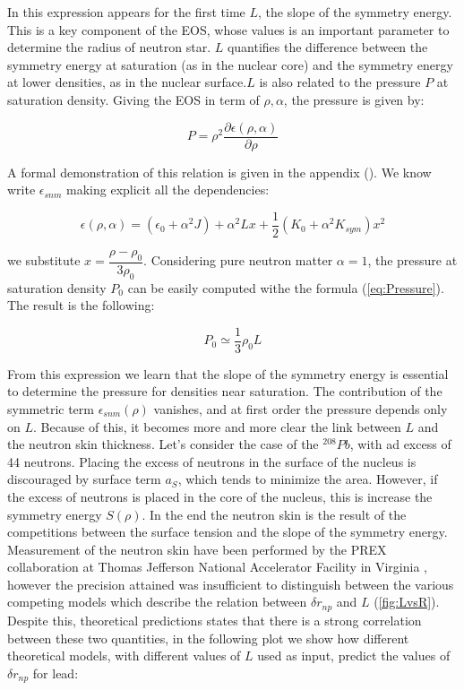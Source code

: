 In this expression appears for the first time $L$, the slope of the symmetry energy. This is a key component of the EOS, whose values is an important parameter to determine the radius of neutron star. $L$ quantifies the difference between the symmetry energy at saturation (as in the nuclear core) and the symmetry energy at lower densities, as in the nuclear surface.$L$ is also related to the pressure $P$ at saturation density. Giving the EOS in term of $\rho,\alpha$, the pressure is given by:

\begin{equation} \label{eq:Pressure}
P = \rho^{2} \dfrac{\partial \epsilon(\rho, \alpha)}{\partial \rho}
\end{equation} 

A formal demonstration of this relation is given in the appendix (). We know write $\epsilon_{snm}$ making explicit all the dependencies:

\begin{equation}
\epsilon (\rho, \alpha) = (\epsilon_{0} + \alpha^{2} J) + \alpha^{2}Lx + \frac{1}{2} (K_{0} + \alpha^{2}K_{sym})x^{2}
\end{equation}

we substitute $x = \dfrac{\rho - \rho_{0}}{3 \rho_{0}}$. Considering pure neutron matter $\alpha = 1$, the pressure at saturation density $P_{0}$ can be easily computed withe the formula (\ref{eq:Pressure}). The result is the following:

\begin{equation}
P_{0} \simeq \dfrac{1}{3}\rho_{0} L
\end{equation}

From this expression we learn that the slope of the symmetry energy is essential to determine the pressure for densities near saturation. The contribution of the symmetric term $\epsilon_{snm}(\rho)$ vanishes, and at first order the pressure depends only on $L$. Because of this, it becomes more and more clear the link between $L$ and the neutron skin thickness. Let's consider the case of the $^{208}Pb$, with ad excess of 44 neutrons. Placing the excess of neutrons in the surface of the nucleus is discouraged by surface term $a_{S}$, which tends to minimize the area. However, if the excess of neutrons is placed in the core of the nucleus, this is increase the symmetry energy $S(\rho)$. In the end the neutron skin is the result of the competitions between the surface tension and the slope of the symmetry energy.
 Measurement of the neutron skin have been performed by the PREX collaboration at Thomas Jefferson National Accelerator Facility in Virginia \cite{Abrahamyan:2012gp}, however the precision attained was insufficient to distinguish between the various competing models which describe the relation between $\delta r_{np}$ and $L$ (\ref{fig:LvsR}). Despite this, theoretical predictions states that there is a strong correlation between these two quantities, in the following plot we show how different theoretical models, with different values of $L$ used as input, predict the values of $\delta r_{np}$ for lead:

